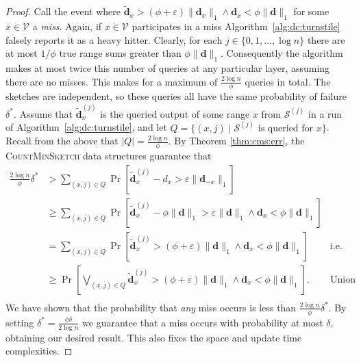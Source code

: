 \documentclass{report}
\newcommand{\algoname}[1]{\textnormal{\textsc{#1}}}
\begin{document}
\begin{proof}
Call the event where $\widetilde{\mathbf{d}}_x > (\phi + \varepsilon) \|\mathbf{d}_{x}\|_1 \wedge \mathbf{d}_x < \phi \|\mathbf{d}\|_1$ for some $x \in \mathcal{V}$ a \emph{miss}.
Again, if $x \in \mathcal{V}$ participates in a miss Algorithm~\ref{alg:dc:turnstile} falsely reports it as a heavy hitter.
Clearly, for each $j \in \{0, 1, \dots, \log n\}$ there are at most $1/\phi$ true range sums greater than $\phi \|\mathbf{d}\|_1$. 
Consequently the algorithm makes at most twice this number of queries at any particular layer, assuming there are no misses. 
This makes for a maximum of $\frac {2 \log n}{\phi}$ queries in total. 
The sketches are independent, so these queries all have the same probability of failure $\delta^*$.
Assume that $\widetilde{\mathbf{d}}_x^{(j)}$ is the queried output of some range $x$ from $\mathcal{S}^{(j)}$ in a run of Algorithm~\ref{alg:dc:turnstile}, and 
let $Q = \{(x, j) \mid \mathcal{S}^{(j)} \text{ is queried for $x$}\}$.
Recall from the above that $|Q| = \frac{2 \log n}{\phi}$.
By Theorem \ref{thm:cms:err}, the \algoname{CountMinSketch} data structures guarantee that
%
\begin{align*}
\frac{2\log n}{\phi}\delta^*
&>
\sum_{(x, j) \in Q} \Pr \left [ \widetilde{\mathbf{d}}_x^{(j)} - d_x > \varepsilon \|\mathbf{d}_{-x}\|_1 \right ] 
& \\
&\geq
\sum_{(x, j) \in Q} \Pr \left [ \widetilde{\mathbf{d}}_x^{(j)} - \phi\|\mathbf{d}\|_1 > \varepsilon \|\mathbf{d}\|_1 \wedge \mathbf{d}_x < \phi \|\mathbf{d}\|_1 \right ] 
& \\
&=
\sum_{(x, j) \in Q} \Pr \left [ \widetilde{\mathbf{d}}_x^{(j)} > (\phi + \varepsilon) \|\mathbf{d}\|_1 \wedge \mathbf{d}_x < \phi \|\mathbf{d}\|_1 \right ] 
& \text{i.e. sum of misses}  \\
&\geq
\Pr \left [ \bigvee_{(x, j) \in Q} \widetilde{\mathbf{d}}_x^{(j)} > (\phi + \varepsilon) \|\mathbf{d}\|_1 \wedge \mathbf{d}_x < \phi \|\mathbf{d}\|_1 \right ].
& \text{Union bound} \\
\end{align*}
We have shown that the probability that \emph{any} miss occurs is less than $\frac{2\log n}{\phi}\delta^*$.
By setting $\delta^* = \frac{\phi\delta}{2\log n}$ we guarantee that a miss occurs with probability at most $\delta$, obtaining our desired result.
This also fixes the space and update time complexities.
\end{proof}
\end{document}
